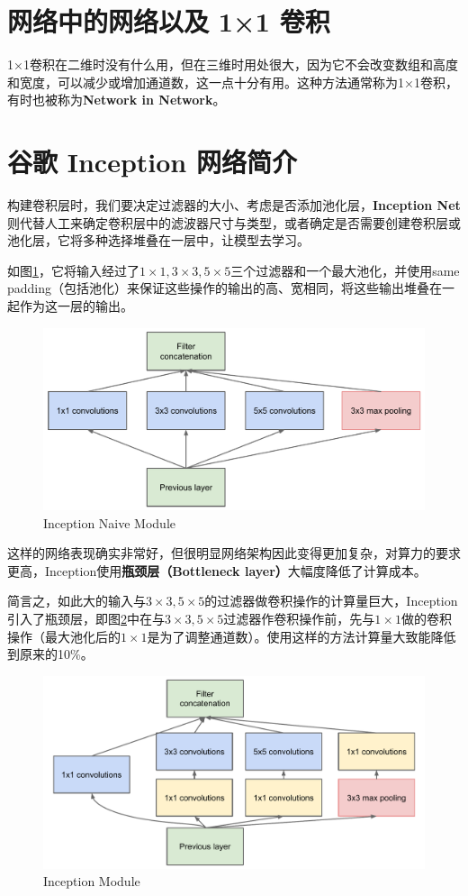 \documentclass[../../main.tex]{subfiles}
\begin{document}
\begin{refsection}
\section{网络中的网络以及 1×1 卷积}
1×1卷积在二维时没有什么用，但在三维时用处很大，因为它不会改变数组和高度和宽度，可以减少或增加通道数，这一点十分有用。这种方法通常称为1×1卷积，有时也被称为\textbf{Network in Network}。

\section{谷歌 Inception 网络简介}
构建卷积层时，我们要决定过滤器的大小、考虑是否添加池化层，\textbf{Inception Net}则代替人工来确定卷积层中的滤波器尺寸与类型，或者确定是否需要创建卷积层或池化层，它将多种选择堆叠在一层中，让模型去学习。

如图\ref{fig:inception-naive-module}，它将输入经过了\(1×1, 3×3, 5×5\)三个过滤器和一个最大池化，并使用same padding（包括池化）来保证这些操作的输出的高、宽相同，将这些输出堆叠在一起作为这一层的输出。
\begin{figure}[htbp]
    \centering
    \includegraphics[width=0.75\columnwidth]{./img/inception-naive-module.pdf}
    \caption{Inception Naive Module}
    \label{fig:inception-naive-module}
\end{figure}
这样的网络表现确实非常好，但很明显网络架构因此变得更加复杂，对算力的要求更高，Inception使用\textbf{瓶颈层（Bottleneck layer）}大幅度降低了计算成本。

简言之，如此大的输入与\(3×3, 5×5\)的过滤器做卷积操作的计算量巨大，Inception引入了瓶颈层，即图\ref{fig:inception-module}中在与\(3×3, 5×5\)过滤器作卷积操作前，先与\(1×1\)做的卷积操作（最大池化后的\(1×1\)是为了调整通道数）。使用这样的方法计算量大致能降低到原来的10\%。
\begin{figure}[htbp]
    \centering
    \includegraphics[width=0.7\columnwidth]{./img/inception-module.pdf}
    \caption{Inception Module}
    \label{fig:inception-module}
\end{figure}


\end{refsection}
\end{document}
